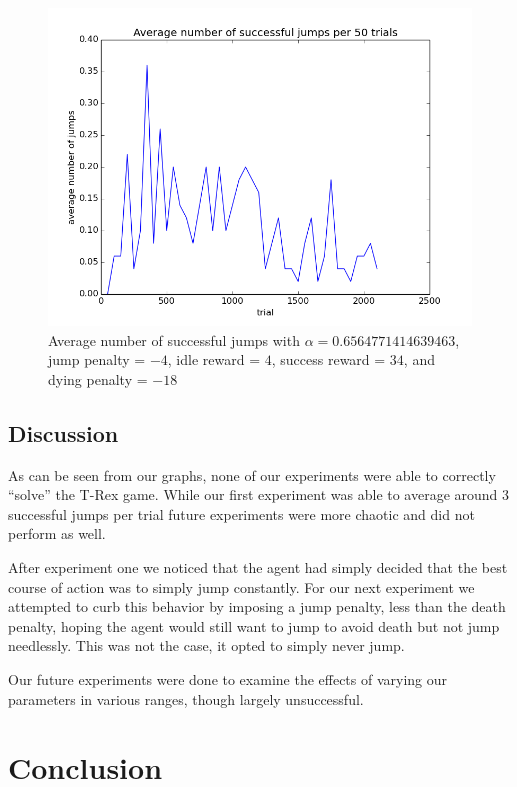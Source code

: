 \documentclass{scrartcl}
\begin{document}
    \begin{figure}[H]
        \includegraphics[width=\textwidth]{../avgJumps4}    
        \caption{Average number of successful jumps with $\alpha =
        0.6564771414639463$, jump penalty = $-4$, idle reward = $4$, success
        reward = $34$, and dying penalty = $-18$}
        \label{fig:exp4}
    \end{figure}

    \subsection{Discussion}
    As can be seen from our graphs, none of our experiments were able to
    correctly ``solve'' the T-Rex game. While our first experiment was able to
    average around 3 successful jumps per trial future experiments were more
    chaotic and did not perform as well.

    After experiment one we noticed that the agent had simply decided that the
    best course of action was to simply jump constantly. For our next experiment
    we attempted to curb this behavior by imposing a jump penalty, less than the
    death penalty, hoping the agent would still want to jump to avoid death but
    not jump needlessly. This was not the case, it opted to simply never jump.

    Our future experiments were done to examine the effects of varying
    our parameters in various ranges, though largely unsuccessful.


\section{Conclusion}



\end{document}
